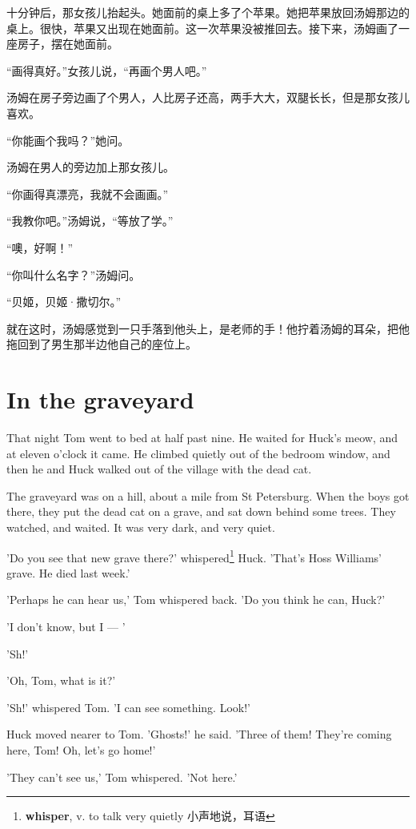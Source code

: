 \documentclass[fontset=ubuntu, zihao=5]{ctexart}
\begin{document}
\begin{paracol}{2}
十分钟后，那女孩儿抬起头。她面前的桌上多了个苹果。她把苹果放回汤姆那边的桌上。很快，苹果又出现在她面前。这一次苹果没被推回去。接下来，汤姆画了一座房子，摆在她面前。

“画得真好。”女孩儿说，“再画个男人吧。”

汤姆在房子旁边画了个男人，人比房子还高，两手大大，双腿长长，但是那女孩儿喜欢。

“你能画个我吗？”她问。

汤姆在男人的旁边加上那女孩儿。

“你画得真漂亮，我就不会画画。”

“我教你吧。”汤姆说，“等放了学。”

“噢，好啊！”

“你叫什么名字？”汤姆问。

“贝姬，贝姬·撒切尔。”

就在这时，汤姆感觉到一只手落到他头上，是老师的手！他拧着汤姆的耳朵，把他拖回到了男生那半边他自己的座位上。

\switchcolumn*


\section{In the graveyard}

That night Tom went to bed at half past nine. He waited for Huck's meow, and at eleven o'clock it came. He climbed quietly out of the bedroom window, and then he and Huck walked out of the village with the dead cat.

The graveyard was on a hill, about a mile from St Petersburg. When the boys got there, they put the dead cat on a grave, and sat down behind some trees. They watched, and waited. It was very dark, and very quiet.

'Do you see that new grave there?' whispered\footnote{\textbf{whisper}, v. to talk very quietly 小声地说，耳语} Huck. 'That's Hoss Williams' grave. He died last week.'

'Perhaps he can hear us,' Tom whispered back. 'Do you think he can, Huck?'

'I don't know, but I — '

'Sh!'

'Oh, Tom, what is it?'

'Sh!' whispered Tom. 'I can see something. Look!'

Huck moved nearer to Tom. 'Ghosts!' he said. 'Three of them! They're coming here, Tom! Oh, let's go home!'

'They can't see us,' Tom whispered. 'Not here.'


\end{paracol}
\end{document}
